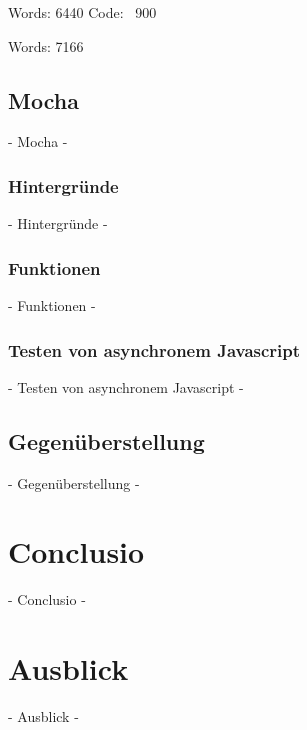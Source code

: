 Words: 6440
Code: ~900

Words: 7166

\subsection{Mocha}
 - Mocha -

\subsubsection{Hintergründe}
 - Hintergründe -
\subsubsection{Funktionen}
 - Funktionen -
\subsubsection{Testen von asynchronem Javascript}
 - Testen von asynchronem Javascript -

\subsection{Gegenüberstellung}
 - Gegenüberstellung -
\newpage
\section{Conclusio}
 - Conclusio -

\newpage
\section{Ausblick}
 - Ausblick -

\nocite{Green:2013}
\nocite{Kozlowski:2013}
\nocite{Zakas:2012}
\nocite{MacCaw:2011}
\nocite{Burnham:2011}
\nocite{Gaertner:2012}
